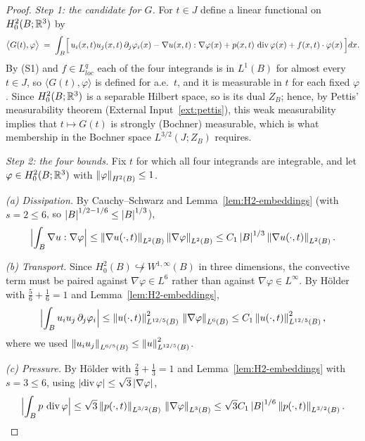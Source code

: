 \documentclass[11pt,reqno]{amsart}
\begin{document}
\begin{proof}
\emph{Step 1: the candidate for $G$.} For $t\in J$ define a linear functional on
$H^{2}_{0}(B;\mathbb{R}^{3})$ by
\begin{equation}\label{eq:G-def}
  \bigl\langle G(t),\varphi\bigr\rangle
  \;=\;\int_{B}\Bigl[\,u_{i}(x,t)u_{j}(x,t)\,\partial_{j}\varphi_{i}(x)
      -\nabla u(x,t):\nabla\varphi(x)
      +p(x,t)\,\operatorname{div}\varphi(x)
      +f(x,t)\cdot\varphi(x)\,\Bigr]dx .
\end{equation}
By (S1) and $f\in L^{q}_{loc}$ each of the four integrands is in $L^{1}(B)$ for
almost every $t\in J$, so $\langle G(t),\varphi\rangle$ is defined for a.e.\
$t$, and it is measurable in $t$ for each fixed $\varphi$. Since
$H^{2}_{0}(B;\mathbb{R}^{3})$ is a separable Hilbert space, so is its dual $Z_{B}$;
hence, by Pettis' measurability theorem
(External Input~\ref{ext:pettis}), this weak measurability implies that
$t\mapsto G(t)$ is strongly (Bochner) measurable, which is what membership in
the Bochner space $L^{3/2}(J;Z_{B})$ requires.

\emph{Step 2: the four bounds.} Fix $t$ for which all four integrands are
integrable, and let $\varphi\in H^{2}_{0}(B;\mathbb{R}^{3})$ with
$\left\lVert \varphi \right\rVert_{H^{2}(B)}\le1$.

\emph{(a) Dissipation.} By Cauchy--Schwarz and
Lemma~\ref{lem:H2-embeddings} (with $s=2\le6$, so
$\left\lvert B \right\rvert^{1/2-1/6}\le\left\lvert B \right\rvert^{1/3}$),
\[
  \Bigl|\int_{B}\nabla u:\nabla\varphi\Bigr|
  \le\left\lVert \nabla u(\cdot,t) \right\rVert_{L^{2}(B)}\left\lVert \nabla\varphi \right\rVert_{L^{2}(B)}
  \le C_{1}\left\lvert B \right\rvert^{1/3}\left\lVert \nabla u(\cdot,t) \right\rVert_{L^{2}(B)} .
\]

\emph{(b) Transport.} Since $H^{2}_{0}(B)\not\hookrightarrow W^{1,\infty}(B)$ in
three dimensions, the convective term must be paired against
$\nabla\varphi\in L^{6}$ rather than against $\nabla\varphi\in L^{\infty}$. By
H\"older with $\tfrac{5}{6}+\tfrac16=1$ and Lemma~\ref{lem:H2-embeddings},
\[
  \Bigl|\int_{B}u_{i}u_{j}\,\partial_{j}\varphi_{i}\Bigr|
  \le\left\lVert u(\cdot,t) \right\rVert_{L^{12/5}(B)}^{2}\,
     \left\lVert \nabla\varphi \right\rVert_{L^{6}(B)}
  \le C_{1}\left\lVert u(\cdot,t) \right\rVert_{L^{12/5}(B)}^{2} ,
\]
where we used $\left\lVert u_{i}u_{j} \right\rVert_{L^{6/5}(B)}\le\left\lVert u \right\rVert_{L^{12/5}(B)}^{2}$.

\emph{(c) Pressure.} By H\"older with $\tfrac{2}{3}+\tfrac13=1$ and
Lemma~\ref{lem:H2-embeddings} with $s=3\le6$, using
$\left\lvert \operatorname{div}\varphi \right\rvert\le\sqrt{3}\left\lvert \nabla\varphi \right\rvert$,
\[
  \Bigl|\int_{B}p\,\operatorname{div}\varphi\Bigr|
  \le\sqrt{3}\left\lVert p(\cdot,t) \right\rVert_{L^{3/2}(B)}\,\left\lVert \nabla\varphi \right\rVert_{L^{3}(B)}
  \le\sqrt{3}C_{1}\left\lvert B \right\rvert^{1/6}\left\lVert p(\cdot,t) \right\rVert_{L^{3/2}(B)} .
\]


\end{proof}
\end{document}
